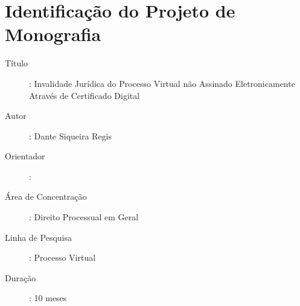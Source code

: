 \chapter{Identificação do Projeto de Monografia}

\begin{description}
\item[Título]: Invalidade Jurídica do Processo Virtual não Assinado Eletronicamente Através de Certificado Digital\par
\item[Autor]: Dante Siqueira Regis\par
\item[Orientador]: \par
\item[Área de Concentração]: Direito Processual em Geral\par
\item[Linha de Pesquisa]: Processo Virtual\par
\item[Duração]: 10 meses
\end{description}
